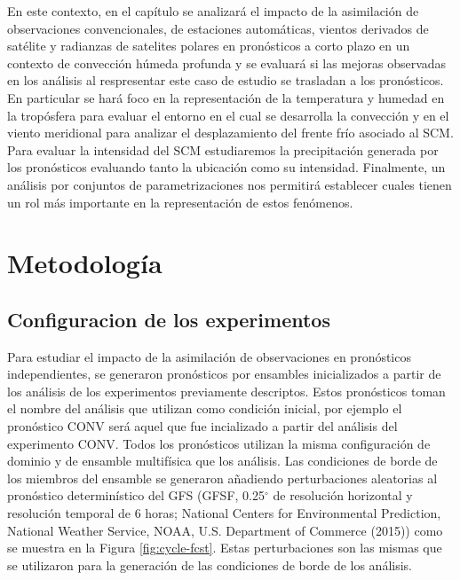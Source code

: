 \documentclass[12pt,oneside,a4paper]{reedthesis}
\begin{document}
En este contexto, en el capítulo se analizará el impacto de la asimilación de observaciones convencionales, de
estaciones automáticas, vientos derivados de satélite y radianzas de satelites polares en pronósticos a corto plazo en un contexto de convección húmeda profunda y se evaluará si las mejoras observadas en los análisis al respresentar este caso de estudio se trasladan a los pronósticos. En particular se hará foco en la representación de la temperatura y humedad en la tropósfera para evaluar el entorno en el cual se desarrolla la convección y en el viento meridional para analizar el desplazamiento del frente frío asociado al SCM. Para evaluar la intensidad del SCM estudiaremos la precipitación generada por los pronósticos evaluando tanto la ubicación como su intensidad. Finalmente, un análisis por conjuntos de parametrizaciones nos permitirá establecer cuales tienen un rol más importante en la representación de estos fenómenos.

\hypertarget{metodologuxeda-1}{%
\section{Metodología}\label{metodologuxeda-1}}

\hypertarget{configuracion-de-los-experimentos}{%
\subsection{Configuracion de los experimentos}\label{configuracion-de-los-experimentos}}

Para estudiar el impacto de la asimilación de observaciones en pronósticos independientes, se generaron pronósticos por ensambles inicializados a partir de los análisis de los experimentos previamente descriptos. Estos pronósticos toman el nombre del análisis que utilizan como condición inicial, por ejemplo el pronóstico CONV será aquel que fue incializado a partir del análisis del experimento CONV. Todos los pronósticos utilizan la misma configuración de dominio y de ensamble multifísica que los análisis. Las condiciones de borde de los miembros del ensamble se generaron añadiendo perturbaciones aleatorias al pronóstico determinístico del GFS (GFSF, 0.25\(^{\circ}\) de resolución horizontal y resolución temporal de 6 horas; National Centers for Environmental Prediction, National Weather Service, NOAA, U.S. Department of Commerce (2015)) como se muestra en la Figura \ref{fig:cycle-fcst}. Estas perturbaciones son las mismas que se utilizaron para la generación de las condiciones de borde de los análisis.
\end{document}
